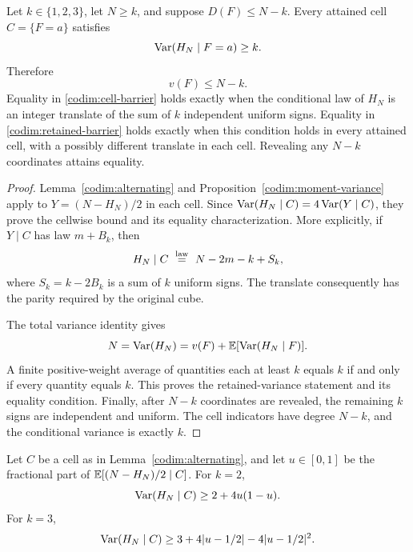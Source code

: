 \begin{theorem}
\label{codim:barrier}
Let \(k\in\{1,2,3\}\), let \(N\ge k\), and suppose
\(D(F)\le N-k\).  Every attained cell \(C=\{F=a\}\) satisfies
\begin{equation}
\label{codim:cell-barrier}
\operatorname{Var}(H_N\mid F=a)\ge k.
\end{equation}
Therefore
\begin{equation}
\label{codim:retained-barrier}
v(F)\le N-k.
\end{equation}
Equality in \eqref{codim:cell-barrier} holds exactly when the
conditional law of \(H_N\) is an integer translate of the sum of
\(k\) independent uniform signs.  Equality in
\eqref{codim:retained-barrier} holds exactly when this condition holds
in every attained cell, with a possibly different translate in each
cell.  Revealing any \(N-k\) coordinates attains equality.
\end{theorem}

\begin{proof}
Lemma~\ref{codim:alternating} and
Proposition~\ref{codim:moment-variance} apply to
\(Y=(N-H_N)/2\) in each cell.  Since
\(\operatorname{Var}(H_N\mid C)=4\operatorname{Var}(Y\mid C)\), they prove the cellwise
bound and its equality characterization.  More explicitly, if
\(Y\mid C\) has law \(m+B_k\), then
\[
H_N\mid C\ \stackrel{\rm law}{=}\
N-2m-k+S_k,
\]
where \(S_k=k-2B_k\) is a sum of \(k\) uniform signs.
The translate consequently has the parity required by the original
cube.

The total variance identity gives
\[
N=\operatorname{Var}(H_N)
=v(F)+\mathbb E[\operatorname{Var}(H_N\mid F)].
\]
A finite positive-weight average of quantities each at least \(k\)
equals \(k\) if and only if every quantity equals \(k\).  This proves
the retained-variance statement and its equality condition.
Finally, after \(N-k\) coordinates are revealed, the remaining
\(k\) signs are independent and uniform.  The cell indicators have
degree \(N-k\), and the conditional variance is exactly \(k\).
\end{proof}

\begin{corollary}
\label{codim:mean-sensitive}
Let \(C\) be a cell as in Lemma~\ref{codim:alternating}, and let
\(u\in[0,1]\) be the fractional part of
\(\mathbb E[(N-H_N)/2\mid C]\).  For \(k=2\),
\begin{equation}
\label{codim:mean-two}
\operatorname{Var}(H_N\mid C)\ge2+4u(1-u).
\end{equation}
For \(k=3\),
\begin{equation}
\label{codim:mean-three}
\operatorname{Var}(H_N\mid C)
\ge3+4|u-1/2|-4|u-1/2|^2.
\end{equation}
\end{corollary}

